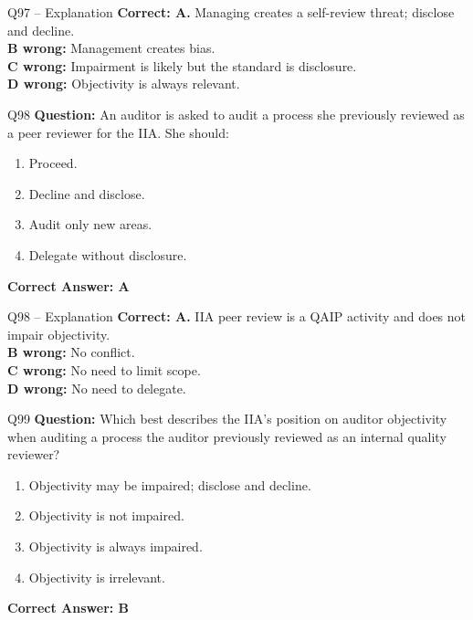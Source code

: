 \documentclass[aspectratio=169,10pt]{beamer}
\begin{document}
	\begin{frame}[t]{Q97 -- Explanation}
		\small
		\textbf{Correct: A.} Managing creates a self-review threat; disclose and decline. \\[4pt]
		\textbf{B wrong:} Management creates bias. \\[2pt]
		\textbf{C wrong:} Impairment is likely but the standard is disclosure. \\[2pt]
		\textbf{D wrong:} Objectivity is always relevant.
	\end{frame}
	
	\begin{frame}[t]{Q98}
		\small
		\textbf{Question:} An auditor is asked to audit a process she previously reviewed as a peer reviewer for the IIA. She should:
		\begin{enumerate}[label=\Alph*.,itemsep=1pt,topsep=2pt]
			\item Proceed.
			\item Decline and disclose.
			\item Audit only new areas.
			\item Delegate without disclosure.
		\end{enumerate}
		\vspace{4pt}
		\textbf{Correct Answer: A}
	\end{frame}
	
	\begin{frame}[t]{Q98 -- Explanation}
		\small
		\textbf{Correct: A.} IIA peer review is a QAIP activity and does not impair objectivity. \\[4pt]
		\textbf{B wrong:} No conflict. \\[2pt]
		\textbf{C wrong:} No need to limit scope. \\[2pt]
		\textbf{D wrong:} No need to delegate.
	\end{frame}
	
	\begin{frame}[t]{Q99}
		\small
		\textbf{Question:} Which best describes the IIA's position on auditor objectivity when auditing a process the auditor previously reviewed as an internal quality reviewer?
		\begin{enumerate}[label=\Alph*.,itemsep=1pt,topsep=2pt]
			\item Objectivity may be impaired; disclose and decline.
			\item Objectivity is not impaired.
			\item Objectivity is always impaired.
			\item Objectivity is irrelevant.
		\end{enumerate}
		\vspace{4pt}
		\textbf{Correct Answer: B}
	\end{frame}
	
\end{document}
